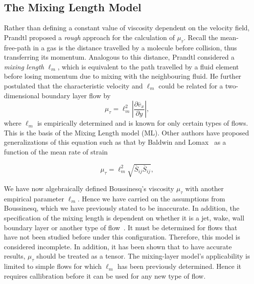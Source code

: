 \subsection{The Mixing Length Model}
Rather than defining a constant value of viscosity dependent on the velocity field, Prandtl proposed a \textit{rough} approach for the calculation of $\mu_\tau$. Recall the mean-free-path in a gas is the distance travelled by a molecule before collision, thus transferring its momentum. Analogous to this distance, Prandtl considered a \textit{mixing length} $\ell_m$, which is equivalent to the path travelled by a fluid element before losing momentum due to mixing with the neighbouring fluid. He further postulated that the characteristic velocity and $\ell_m$ could be related for a two-dimensional boundary layer flow by
\begin{equation}
    \mu_\tau = \ell_m^2 \left| \frac{\partial \overline v_x}{\partial y}\right|,
\end{equation}
where $\ell_m$ is empirically determined and is known for only certain types of flows. This is the basis of the Mixing Length model (ML). Other authors have proposed generalizations of this equation such as that by Baldwin and Lomax~\cite{} as a function of the mean rate of strain~\cite{pope2001turbulent}
\begin{eqBox}
\begin{equation}
    \mu_\tau = \ell_m^2 \sqrt{\overline S_{ij} \overline S_{ij}},
\end{equation}
\end{eqBox}
We have now algebraically defined Boussinesq's viscosity $\mu_\tau$ with another empirical parameter $\ell_m$. Hence we have carried on the assumptions from Boussinesq, which we have previously stated to be inaccurate. In addition, the specification of the mixing length is dependent on whether it is a jet, wake, wall boundary layer or another type of flow~\cite{andersonComputationalFluidMechanics2016}. It must be determined for flows that have not been studied before under this configuration. Therefore, this model is considered incomplete. In addition, it has been shown that to have accurate results, $\mu_\tau$ should be treated as a tensor. The mixing-layer model's applicability is limited to simple flows for which $\ell_m$ has been previously determined. Hence it requires callibration before it can be used for any new type of flow. 

